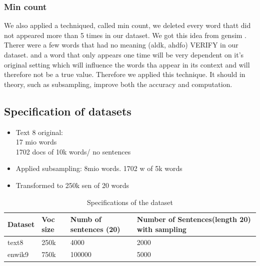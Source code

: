 \subsubsection{Min count}
We also applied a techniqued, called min count, we deleted every word thatt did not appeared more than 5 times in our dataset. We got this idea from gensim \cite{gensim}. Therer were a few words that had no meaning (aldk, ahdfo) VERIFY in our dataset. and a word that only appears one time will be very dependent on it's original setting which will influence the words tha appear in its context and will therefore not be a true value. Therefore we applied this technique. It should in theory, such as subsampling, improve both the accuracy and computation. 
\subsection{Specification of datasets}
\begin{itemize}
\item Text 8 original: \\
17 mio words\\
1702 docs of 10k words/ no sentences 
\item Applied subsampling:
8mio words.
1702 w of 5k words
\item Transformed to  250k sen of 20 words
\end{itemize}

\begin{table}[]
\begin{tabular}{|l|l|l|l|}
\hline
Dataset & Voc size & Numb of sentences (20) & Number of Sentences(length 20) with sampling \\ \hline
text8   & 250k     & 4000                   & 2000                                         \\ \hline
enwik9  & 750k     & 100000                 & 5000                                         \\ \hline
\end{tabular}
\caption{Specifications of the dataset}
\end{table}

